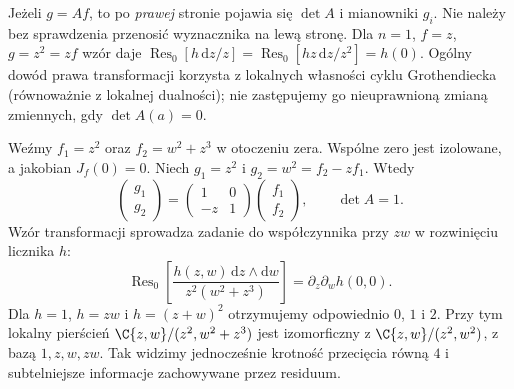 \begin{uwaga}
Jeżeli $g=Af$, to po \emph{prawej} stronie pojawia się
$\det A$ i mianowniki $g_i$. Nie należy bez sprawdzenia
przenosić wyznacznika na lewą stronę.
Dla $n=1$, $f=z$, $g=z^2=zf$ wzór daje
$\operatorname{Res}_0[h\,\mathrm dz/z]
=\operatorname{Res}_0[hz\,\mathrm dz/z^2]=h(0)$.
Ogólny dowód prawa transformacji korzysta z lokalnych
własności cyklu Grothendiecka (równoważnie z lokalnej
dualności); nie zastępujemy go nieuprawnioną zmianą
zmiennych, gdy $\det A(a)=0$.
\end{uwaga}

\begin{przyklad}
\label{prz:ga4-res-degenerate}
Weźmy $f_1=z^2$ oraz $f_2=w^2+z^3$ w otoczeniu zera.
Wspólne zero jest izolowane, a jakobian $J_f(0)=0$.
Niech $g_1=z^2$ i $g_2=w^2=f_2-zf_1$. Wtedy
\[
\begin{pmatrix}g_1\\g_2\end{pmatrix}
=\begin{pmatrix}1&0\\-z&1\end{pmatrix}
\begin{pmatrix}f_1\\f_2\end{pmatrix},\qquad \det A=1.
\]
Wzór transformacji sprowadza zadanie do współczynnika
przy $zw$ w rozwinięciu licznika $h$:
\[
\operatorname{Res}_0\!\left[
\frac{h(z,w)\,\mathrm dz\wedge\mathrm dw}
{z^2(w^2+z^3)}\right]
=\partial_z\partial_w h(0,0).
\]
Dla $h=1$, $h=zw$ i $h=(z+w)^2$ otrzymujemy
odpowiednio $0$, $1$ i $2$.
Przy tym lokalny pierścień
$\C\{z,w\}/(z^2,w^2+z^3)$ jest izomorficzny z
$\C\{z,w\}/(z^2,w^2)$, z bazą $1,z,w,zw$.
Tak widzimy jednocześnie krotność przecięcia równą $4$
i subtelniejsze informacje zachowywane przez residuum.
\end{przyklad}

